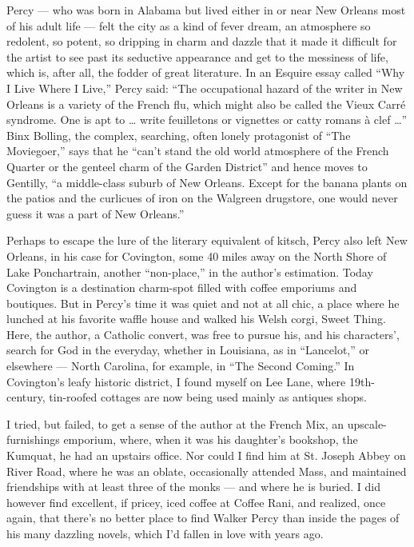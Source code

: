 Percy --- who was born in Alabama but lived either in or near New
Orleans most of his adult life --- felt the city as a kind of fever
dream, an atmosphere so redolent, so potent, so dripping in charm and
dazzle that it made it difficult for the artist to see past its
seductive appearance and get to the messiness of life, which is, after
all, the fodder of great literature. In an Esquire essay called ``Why I
Live Where I Live,'' Percy said: ``The occupational hazard of the writer
in New Orleans is a variety of the French flu, which might also be
called the Vieux Carré syndrome. One is apt to \ldots{} write
feuilletons or vignettes or catty romans à clef \ldots{}'' Binx Bolling,
the complex, searching, often lonely protagonist of ``The Moviegoer,''
says that he ``can't stand the old world atmosphere of the French
Quarter or the genteel charm of the Garden District'' and hence moves to
Gentilly, ``a middle-class suburb of New Orleans. Except for the banana
plants on the patios and the curlicues of iron on the Walgreen
drugstore, one would never guess it was a part of New Orleans.''

Perhaps to escape the lure of the literary equivalent of kitsch, Percy
also left New Orleans, in his case for Covington, some 40 miles away on
the North Shore of Lake Ponchartrain, another ``non-place,'' in the
author's estimation. Today Covington is a destination charm-spot filled
with coffee emporiums and boutiques. But in Percy's time it was quiet
and not at all chic, a place where he lunched at his favorite waffle
house and walked his Welsh corgi, Sweet Thing. Here, the author, a
Catholic convert, was free to pursue his, and his characters', search
for God in the everyday, whether in Louisiana, as in ``Lancelot,'' or
elsewhere --- North Carolina, for example, in ``The Second Coming.'' In
Covington's leafy historic district, I found myself on Lee Lane, where
19th-century, tin-roofed cottages are now being used mainly as antiques
shops.

I tried, but failed, to get a sense of the author at the French Mix, an
upscale-furnishings emporium, where, when it was his daughter's
bookshop, the Kumquat, he had an upstairs office. Nor could I find him
at St. Joseph Abbey on River Road, where he was an oblate, occasionally
attended Mass, and maintained friendships with at least three of the
monks --- and where he is buried. I did however find excellent, if
pricey, iced coffee at Coffee Rani, and realized, once again, that
there's no better place to find Walker Percy than inside the pages of
his many dazzling novels, which I'd fallen in love with years ago.

